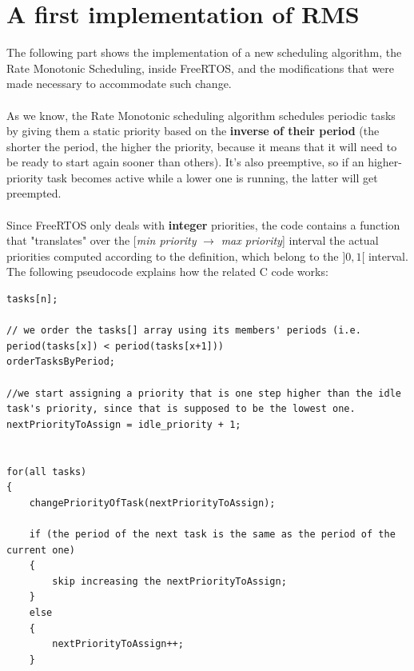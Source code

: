 \documentclass[10pt]{article}
\begin{document}
\section{A first implementation of RMS}
The following part shows the implementation of a new scheduling algorithm, the Rate Monotonic Scheduling, inside FreeRTOS, and the modifications that were made necessary to accommodate such change.\\
\\
As we know, the Rate Monotonic scheduling algorithm schedules periodic tasks by giving them a static priority based on the \textbf{inverse of their period} (the shorter the period, the higher the priority, because it means that it will need to be ready to start again sooner than others). It's also preemptive, so if an higher-priority task becomes active while a lower one is running, the latter will get preempted.
\\
\\
Since FreeRTOS only deals with \textbf{integer} priorities, the code contains a function that "translates" over the [\textit{min priority} \begin{math}\rightarrow\end{math} \textit{max priority}] interval the actual priorities computed according to the definition, which belong to the \begin{math}]0,1[\end{math} interval. The following pseudocode explains how the related C code works:\\

\lstset{language=c}
\begin{lstlisting}
tasks[n];

// we order the tasks[] array using its members' periods (i.e. period(tasks[x]) < period(tasks[x+1]))
orderTasksByPeriod;

//we start assigning a priority that is one step higher than the idle task's priority, since that is supposed to be the lowest one.
nextPriorityToAssign = idle_priority + 1; 


for(all tasks)
{
	changePriorityOfTask(nextPriorityToAssign);
	
	if (the period of the next task is the same as the period of the current one)
	{
		skip increasing the nextPriorityToAssign;
	}
	else
	{
		nextPriorityToAssign++;
	}

\end{lstlisting}
\end{document}
